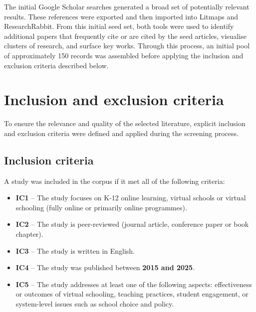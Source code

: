 The initial Google Scholar searches generated a broad set of potentially relevant results.
These references were exported and then imported into Litmaps and ResearchRabbit.
From this initial seed set, both tools were used to identify additional papers that frequently cite or are cited by the seed articles, visualise clusters of research, and surface key works.
Through this process, an initial pool of approximately 150 records was assembled before applying the inclusion and exclusion criteria described below.

\section{Inclusion and exclusion criteria}
To ensure the relevance and quality of the selected literature, explicit inclusion and exclusion criteria were defined and applied during the screening process.

\subsection{Inclusion criteria}
A study was included in the corpus if it met all of the following criteria:
\begin{itemize}
    \item \textbf{IC1} -- The study focuses on K-12 online learning, virtual schools or virtual schooling (fully online or primarily online programmes).
    \item \textbf{IC2} -- The study is peer-reviewed (journal article, conference paper or book chapter).
    \item \textbf{IC3} -- The study is written in English.
    \item \textbf{IC4} -- The study was published between \textbf{2015 and 2025}.
    \item \textbf{IC5} -- The study addresses at least one of the following aspects: effectiveness or outcomes of virtual schooling, teaching practices, student engagement, or system-level issues such as school choice and policy.
\end{itemize}

